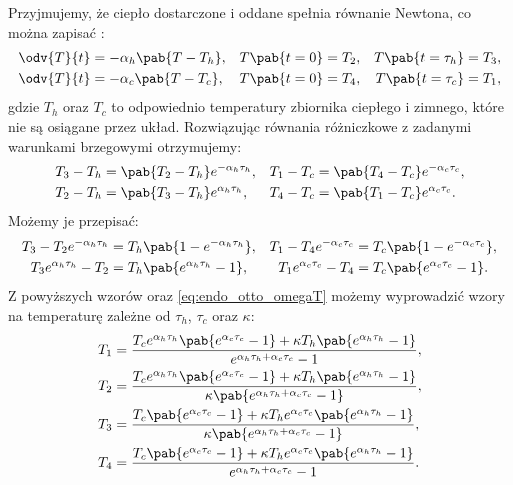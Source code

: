 Przyjmujemy, że ciepło dostarczone i oddane spełnia równanie Newtona, co można zapisać \cite{endo_otto}:
\begin{align}
	\odv{T}{t} &= -\alpha_h \pab{T - T_h}, &
	T\pab{t=0} &= T_2, &
	T\pab{t=\tau_h} &= T_3, \\
	\odv{T}{t} &= -\alpha_c \pab{T - T_c}, &
	T\pab{t=0} &= T_4, &
	T\pab{t=\tau_c} &= T_1,
\end{align}
gdzie \(T_h\) oraz \(T_c\) to odpowiednio temperatury zbiornika ciepłego i zimnego, które nie są osiągane przez układ. Rozwiązując równania różniczkowe z zadanymi warunkami brzegowymi otrzymujemy:
\begin{align*}
	T_3 - T_h &= \pab{T_2 - T_h} e^{-\alpha_h \tau_h}, &
	T_1 - T_c &= \pab{T_4 - T_c} e^{-\alpha_c \tau_c}, \\
	T_2 - T_h &= \pab{T_3 - T_h} e^{\alpha_h \tau_h}, &
	T_4 - T_c &= \pab{T_1 - T_c} e^{\alpha_c \tau_c}.
\end{align*}
Możemy je przepisać:
\begin{align*}
	T_3 - T_2 e^{-\alpha_h \tau_h} &= T_h \pab{1 - e^{-\alpha_h \tau_h}}, &
	T_1 - T_4 e^{-\alpha_c \tau_c} &= T_c \pab{1 - e^{-\alpha_c \tau_c}}, \\
	T_3 e^{\alpha_h \tau_h} - T_2 &= T_h \pab{e^{\alpha_h \tau_h} - 1}, &
	T_1 e^{\alpha_c \tau_c} - T_4 &= T_c \pab{e^{\alpha_c \tau_c} - 1}.
\end{align*}
Z powyższych wzorów oraz \eqref{eq:endo_otto_omegaT} możemy wyprowadzić wzory na temperaturę zależne od \(\tau_h\), \(\tau_c\) oraz \(\kappa\):
\begin{equation}\label{eq:endo_otto_T}
\begin{split}
	T_1 &= \frac{
	T_c e^{\alpha_h \tau_h} \pab{e^{\alpha_c \tau_c} - 1} + \kappa T_h \pab{e^{\alpha_h \tau_h} - 1}
	}{
	e^{\alpha_h \tau_h + \alpha_c \tau_c} - 1
	}, \\
	T_2 &= \frac{
	T_c e^{\alpha_h \tau_h} \pab{e^{\alpha_c \tau_c} - 1} + \kappa T_h \pab{e^{\alpha_h \tau_h} - 1}
	}{
	\kappa \pab{e^{\alpha_h \tau_h + \alpha_c \tau_c} - 1}
	}, \\
	T_3 &= \frac{
	T_c \pab{e^{\alpha_c \tau_c} - 1} + \kappa T_h e^{\alpha_c \tau_c} \pab{e^{\alpha_h \tau_h} - 1}
	}{
	\kappa \pab{e^{\alpha_h \tau_h + \alpha_c \tau_c} - 1}
	}, \\
	T_4 &= \frac{
	T_c \pab{e^{\alpha_c \tau_c} - 1} + \kappa T_h e^{\alpha_c \tau_c} \pab{e^{\alpha_h \tau_h} - 1}
	}{
	e^{\alpha_h \tau_h + \alpha_c \tau_c} - 1
	}.
\end{split}
\end{equation}

